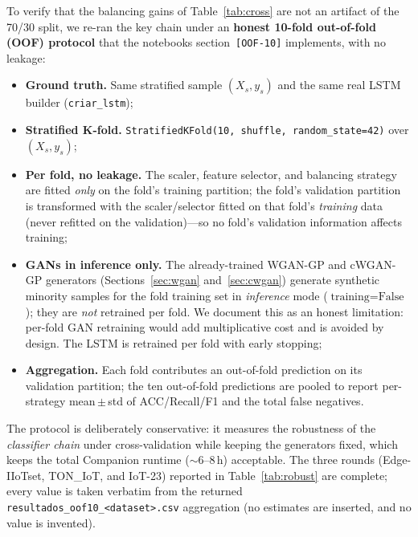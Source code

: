 ﻿\documentclass[journal]{IEEEtran}
\begin{document}
To verify that the balancing gains of Table~\ref{tab:cross} are not an
artifact of the {70/30} split, we re-ran the key chain under an
\textbf{honest 10-fold out-of-fold (OOF) protocol} that the notebooks
section~{\tt [OOF-10]} implements, with no leakage:
\begin{itemize}
  \item \textbf{Ground truth.} Same stratified sample $(X_s,y_s)$ and the
        same real LSTM builder ({\tt criar\_lstm});
  \item \textbf{Stratified K-fold.} {\tt StratifiedKFold(10, shuffle,
        random\_state=42)} over $(X_s,y_s)$;
  \item \textbf{Per fold, no leakage.} The scaler, feature selector, and
        balancing strategy are fitted \emph{only} on the fold's training
        partition; the fold's validation partition is transformed with the
        scaler/selector fitted on that fold's \emph{training} data (never
        refitted on the validation)---so no fold's validation information
        affects training;
  \item \textbf{GANs in inference only.} The already-trained WGAN-GP and
        cWGAN-GP generators (Sections~\ref{sec:wgan} and~\ref{sec:cwgan})
        generate synthetic minority samples for the fold training set in
        \emph{inference} mode ($\text{training}=\text{False}$); they are
        \emph{not} retrained per fold. We document this as an honest
        limitation: per-fold GAN retraining would add multiplicative cost
        and is avoided by design. The LSTM is retrained per fold with early
        stopping;
  \item \textbf{Aggregation.} Each fold contributes an out-of-fold
        prediction on its validation partition; the ten out-of-fold
        predictions are pooled to report per-strategy
        mean\,$\pm$\,std of ACC/Recall/F1 and the total false negatives.
\end{itemize}
The protocol is deliberately conservative: it measures the robustness of
the \emph{classifier chain} under cross-validation while keeping the
generators fixed, which keeps the total {Companion} runtime
($\sim$6--8\,h) acceptable. The three rounds (Edge-IIoTset, TON\_IoT,
and IoT-23) reported in Table~\ref{tab:robust} are complete; every value is
taken verbatim from the returned {\tt resultados\_oof10\_<dataset>.csv}
aggregation (no estimates are inserted, and no value is invented).
\end{document}
